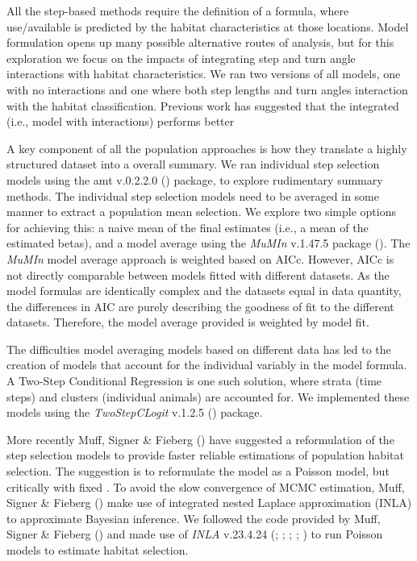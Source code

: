 \documentclass[10pt,a4paper]{article}
\begin{document}
All the step-based methods require the definition of a formula, where use/available is predicted by the habitat characteristics at those locations.
Model formulation opens up many possible alternative routes of analysis, but for this exploration we focus on the impacts of integrating step and turn angle interactions with habitat characteristics.
We ran two versions of all models, one with no interactions and one where both step lengths and turn angles interaction with the habitat classification.
Previous work has suggested that the integrated (i.e., model with interactions) performs better

A key component of all the population approaches is how they translate a highly structured dataset into a overall summary.
We ran individual step selection models using the amt v.0.2.2.0 () package, to explore rudimentary summary methods.
The individual step selection models need to be averaged in some manner to extract a population mean selection.
We explore two simple options for achieving this: a naive mean of the final estimates (i.e., a mean of the estimated betas), and a model average using the \emph{MuMIn} v.1.47.5 package ().
The \emph{MuMIn} model average approach is weighted based on AICc.
However, AICc is not directly comparable between models fitted with different datasets.
As the model formulas are identically complex and the datasets equal in data quantity, the differences in AIC are purely describing the goodness of fit to the different datasets.
Therefore, the model average provided is weighted by model fit.

The difficulties model averaging models based on different data has led to the creation of models that account for the individual variably in the model formula.
A Two-Step Conditional Regression is one such solution, where strata (time steps) and clusters (individual animals) are accounted for.
We implemented these models using the \emph{TwoStepCLogit} v.1.2.5 () package.

More recently Muff, Signer \& Fieberg () have suggested a reformulation of the step selection models to provide faster reliable estimations of population habitat selection.
The suggestion is to reformulate the model as a Poisson model, but critically with fixed .
To avoid the slow convergence of MCMC estimation, Muff, Signer \& Fieberg () make use of integrated nested Laplace approximation (INLA) to approximate Bayesian inference.
We followed the code provided by Muff, Signer \& Fieberg () and made use of \emph{INLA} v.23.4.24 (; ; ; ; ) to run Poisson models to estimate habitat selection.
\end{document}

